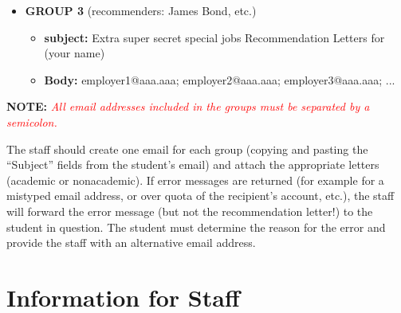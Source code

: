 \documentclass{\econtex}
\begin{document}
\begin{enumerate}
\begin{itemize}
  \item \textbf{ GROUP 3} (recommenders: James Bond, etc.)
    \begin{itemize}
    \item \textbf{ subject:} Extra super secret special jobs Recommendation Letters for (your name)
    \item \textbf{ Body:} employer1@aaa.aaa; employer2@aaa.aaa; employer3@aaa.aaa; ...
    \end{itemize}
  \end{itemize}

  \textbf{NOTE:} \textcolor{red}{\textit{All email addresses included in the groups must be separated by a semicolon.}}

  \normalsize

  The staff should create one email for each group (copying and pasting
  the ``Subject'' fields from the student's email) and attach
  the appropriate letters (academic or nonacademic).  If error
  messages are returned (for example for a mistyped email address, or
  over quota of the recipient's account, etc.), the staff will forward
  the error message (but not the recommendation letter!) to the student
  in question. The student must determine the reason for the error and
  provide the staff with an alternative email address.


  \section{Information for Staff}%


\end{enumerate}
\end{document}
